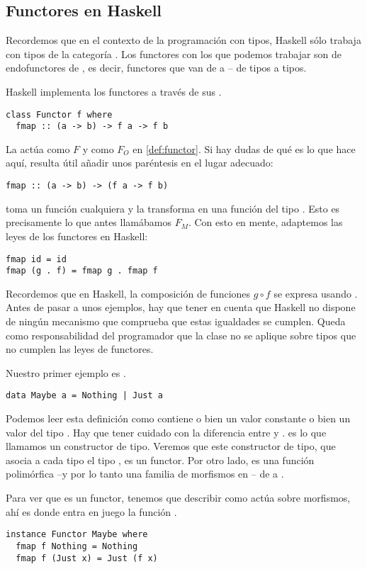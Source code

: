 \subsection{Functores en Haskell}
Recordemos que en el contexto de la programación con tipos, Haskell sólo trabaja con tipos de la categoría .
Los functores con los que podemos trabajar son de endofunctores de , es decir, functores que van de  a  -- de tipos a tipos.

Haskell implementa los functores a través de sus .
\begin{verbatim}
class Functor f where
  fmap :: (a -> b) -> f a -> f b
\end{verbatim}

La  actúa como $F$ y como $F_O$ en \ref{def:functor}.
Si hay dudas de qué es lo que hace  aquí, resulta útil añadir unos paréntesis en el lugar adecuado:

\begin{verbatim}
fmap :: (a -> b) -> (f a -> f b)
\end{verbatim}

 toma un función cualquiera  y la transforma en una función del tipo .
Esto es precisamente lo que antes llamábamos $F_M$.
Con esto en mente, adaptemos las leyes de los functores en Haskell:
\begin{verbatim}
fmap id = id
fmap (g . f) = fmap g . fmap f
\end{verbatim}
Recordemos que en Haskell, la composición de funciones $g \circ f$ se expresa usando .
Antes de pasar a unos ejemplos, hay que tener en cuenta que Haskell no dispone de ningún mecanismo que comprueba que estas igualdades se cumplen.
Queda como responsabilidad del programador que la clase  no se aplique sobre tipos que no cumplen las leyes de functores. 

\begin{example}
Nuestro primer ejemplo es .
\begin{verbatim}
data Maybe a = Nothing | Just a 
\end{verbatim}

Podemos leer esta definición como  contiene o bien un valor constante o bien un valor del tipo .
Hay que tener cuidado con la diferencia entre  y .
 es lo que llamamos un constructor de tipo.
Veremos que este constructor de tipo, que asocia a cada tipo  el tipo , es un functor.
Por otro lado,  es una función polimórfica --y por lo tanto una familia de morfismos en -- de  a .

Para ver que  es un functor, tenemos que describir como actúa sobre morfismos, ahí es donde entra en juego la función .

\begin{verbatim}
instance Functor Maybe where
  fmap f Nothing = Nothing
  fmap f (Just x) = Just (f x) 
\end{verbatim}
\end{example}

